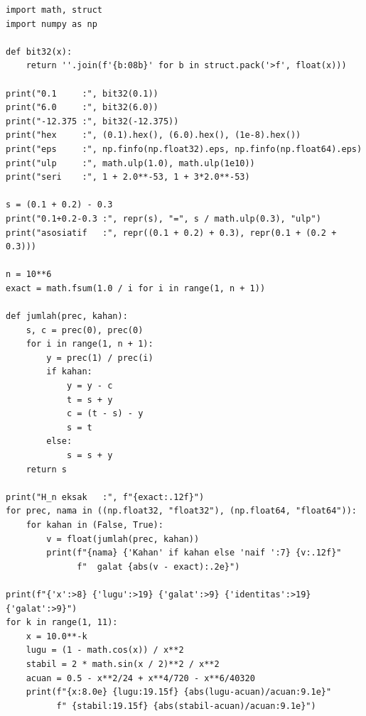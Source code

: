 \begin{lab}
\begin{verbatim}
import math, struct
import numpy as np

def bit32(x):
    return ''.join(f'{b:08b}' for b in struct.pack('>f', float(x)))

print("0.1     :", bit32(0.1))
print("6.0     :", bit32(6.0))
print("-12.375 :", bit32(-12.375))
print("hex     :", (0.1).hex(), (6.0).hex(), (1e-8).hex())
print("eps     :", np.finfo(np.float32).eps, np.finfo(np.float64).eps)
print("ulp     :", math.ulp(1.0), math.ulp(1e10))
print("seri    :", 1 + 2.0**-53, 1 + 3*2.0**-53)

s = (0.1 + 0.2) - 0.3
print("0.1+0.2-0.3 :", repr(s), "=", s / math.ulp(0.3), "ulp")
print("asosiatif   :", repr((0.1 + 0.2) + 0.3), repr(0.1 + (0.2 + 0.3)))

n = 10**6
exact = math.fsum(1.0 / i for i in range(1, n + 1))

def jumlah(prec, kahan):
    s, c = prec(0), prec(0)
    for i in range(1, n + 1):
        y = prec(1) / prec(i)
        if kahan:
            y = y - c
            t = s + y
            c = (t - s) - y
            s = t
        else:
            s = s + y
    return s

print("H_n eksak   :", f"{exact:.12f}")
for prec, nama in ((np.float32, "float32"), (np.float64, "float64")):
    for kahan in (False, True):
        v = float(jumlah(prec, kahan))
        print(f"{nama} {'Kahan' if kahan else 'naif ':7} {v:.12f}"
              f"  galat {abs(v - exact):.2e}")

print(f"{'x':>8} {'lugu':>19} {'galat':>9} {'identitas':>19} {'galat':>9}")
for k in range(1, 11):
    x = 10.0**-k
    lugu = (1 - math.cos(x)) / x**2
    stabil = 2 * math.sin(x / 2)**2 / x**2
    acuan = 0.5 - x**2/24 + x**4/720 - x**6/40320
    print(f"{x:8.0e} {lugu:19.15f} {abs(lugu-acuan)/acuan:9.1e}"
          f" {stabil:19.15f} {abs(stabil-acuan)/acuan:9.1e}")


\end{verbatim}
\end{lab}
